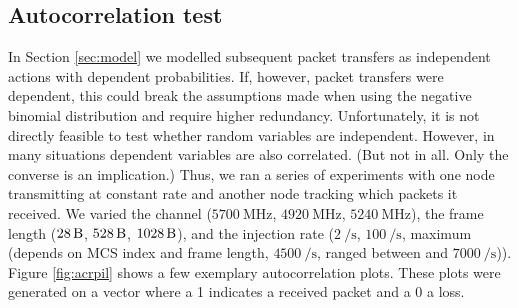 \documentclass[10pt,a4paper]{article}
\begin{document}
\subsection{Autocorrelation test}
In Section \ref{sec:model} we modelled subsequent packet transfers as independent actions with dependent probabilities.
If, however, packet transfers were dependent, this could break the assumptions made when using the negative binomial distribution and require higher redundancy.
Unfortunately, it is not directly feasible to test whether random variables are independent.
However, in many situations dependent variables are also correlated. (But not in all. Only the converse is an implication.)
Thus, we ran a series of experiments with one node transmitting at constant rate and another node tracking which packets it received.
We varied the channel ($\SI{5700}{\mega\hertz}$, $\SI{4920}{\mega\hertz}$, $\SI{5240}{\mega\hertz}$), the frame length ($\SI{28}{\byte}$, $\SI{528}{\byte}$, $\SI{1028}{\byte}$), and the injection rate ($\SI{2}{\per\second}$, $\SI{100}{\per\second}$, maximum (depends on MCS index and frame length, $\SI{4500}{\per\second}$, ranged between and $\SI{7000}{\per\second}$)).
Figure \ref{fig:acrpil} shows a few exemplary autocorrelation plots.
These plots were generated on a vector where a 1 indicates a received packet and a 0 a loss.
\end{document}
